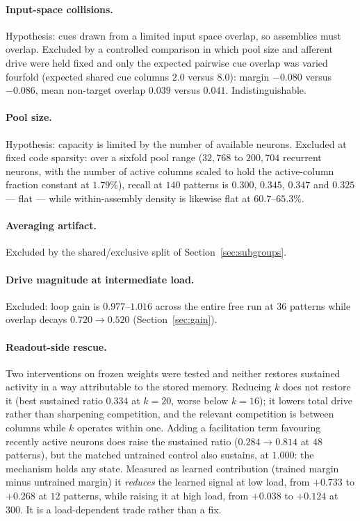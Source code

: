 \documentclass[10pt,twocolumn,a4paper]{article}
\newcommand{\pct}{\%}
\begin{document}
\paragraph{Input-space collisions.}
Hypothesis: cues drawn from a limited input space overlap, so assemblies must overlap.
Excluded by a controlled comparison in which pool size and afferent drive were held fixed
and only the expected pairwise cue overlap was varied fourfold (expected shared cue
columns $2.0$ versus $8.0$): margin $-0.080$ versus $-0.086$, mean non-target overlap
$0.039$ versus $0.041$. Indistinguishable.

\paragraph{Pool size.}
Hypothesis: capacity is limited by the number of available neurons. Excluded at fixed code
sparsity: over a sixfold pool range ($32{,}768$ to $200{,}704$ recurrent neurons, with the
number of active columns scaled to hold the active-column fraction constant at $1.79\pct$),
recall at $140$ patterns is $0.300$, $0.345$, $0.347$ and $0.325$ --- flat --- while
within-assembly density is likewise flat at $60.7$--$65.3\pct$.

\paragraph{Averaging artifact.}
Excluded by the shared/exclusive split of Section~\ref{sec:subgroups}.

\paragraph{Drive magnitude at intermediate load.}
Excluded: loop gain is $0.977$--$1.016$ across the entire free run at $36$ patterns while
overlap decays $0.720 \to 0.520$ (Section~\ref{sec:gain}).

\paragraph{Readout-side rescue.}
Two interventions on frozen weights were tested and neither restores sustained activity in
a way attributable to the stored memory. Reducing $k$ does not restore it (best sustained
ratio $0.334$ at $k=20$, worse below $k=16$); it lowers total drive rather than sharpening
competition, and the relevant competition is between columns while $k$ operates within one.
Adding a facilitation term favouring recently active neurons does raise the sustained ratio
($0.284 \to 0.814$ at $48$ patterns), but the matched untrained control also sustains, at
$1.000$: the mechanism holds any state. Measured as learned contribution (trained margin
minus untrained margin) it \emph{reduces} the learned signal at low load, from $+0.733$ to
$+0.268$ at $12$ patterns, while raising it at high load, from $+0.038$ to $+0.124$ at
$300$. It is a load-dependent trade rather than a fix.
\end{document}

